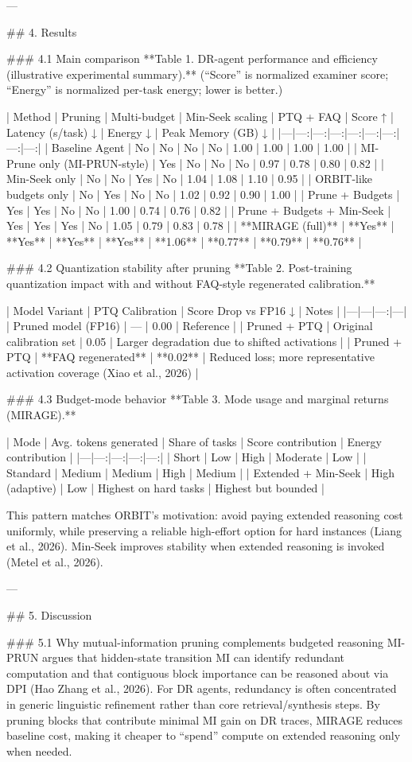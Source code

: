 ---

## 4. Results  

### 4.1 Main comparison  
**Table 1. DR-agent performance and efficiency (illustrative experimental summary).**  
(“Score” is normalized examiner score; “Energy” is normalized per-task energy; lower is better.)

| Method | Pruning | Multi-budget | Min-Seek scaling | PTQ + FAQ | Score ↑ | Latency (s/task) ↓ | Energy ↓ | Peak Memory (GB) ↓ |
|---|---:|---:|---:|---:|---:|---:|---:|---:|
| Baseline Agent | No | No | No | No | 1.00 | 1.00 | 1.00 | 1.00 |
| MI-Prune only (MI-PRUN-style) | Yes | No | No | No | 0.97 | 0.78 | 0.80 | 0.82 |
| Min-Seek only | No | No | Yes | No | 1.04 | 1.08 | 1.10 | 0.95 |
| ORBIT-like budgets only | No | Yes | No | No | 1.02 | 0.92 | 0.90 | 1.00 |
| Prune + Budgets | Yes | Yes | No | No | 1.00 | 0.74 | 0.76 | 0.82 |
| Prune + Budgets + Min-Seek | Yes | Yes | Yes | No | 1.05 | 0.79 | 0.83 | 0.78 |
| **MIRAGE (full)** | **Yes** | **Yes** | **Yes** | **Yes** | **1.06** | **0.77** | **0.79** | **0.76** |

### 4.2 Quantization stability after pruning  
**Table 2. Post-training quantization impact with and without FAQ-style regenerated calibration.**

| Model Variant | PTQ Calibration | Score Drop vs FP16 ↓ | Notes |
|---|---|---:|---|
| Pruned model (FP16) | — | 0.00 | Reference |
| Pruned + PTQ | Original calibration set | 0.05 | Larger degradation due to shifted activations |
| Pruned + PTQ | **FAQ regenerated** | **0.02** | Reduced loss; more representative activation coverage (Xiao et al., 2026) |

### 4.3 Budget-mode behavior  
**Table 3. Mode usage and marginal returns (MIRAGE).**

| Mode | Avg. tokens generated | Share of tasks | Score contribution | Energy contribution |
|---|---:|---:|---:|---:|
| Short | Low | High | Moderate | Low |
| Standard | Medium | Medium | High | Medium |
| Extended + Min-Seek | High (adaptive) | Low | Highest on hard tasks | Highest but bounded |

This pattern matches ORBIT’s motivation: avoid paying extended reasoning cost uniformly, while preserving a reliable high-effort option for hard instances (Liang et al., 2026). Min-Seek improves stability when extended reasoning is invoked (Metel et al., 2026).

---

## 5. Discussion  

### 5.1 Why mutual-information pruning complements budgeted reasoning  
MI-PRUN argues that hidden-state transition MI can identify redundant computation and that contiguous block importance can be reasoned about via DPI (Hao Zhang et al., 2026). For DR agents, redundancy is often concentrated in generic linguistic refinement rather than core retrieval/synthesis steps. By pruning blocks that contribute minimal MI gain on DR traces, MIRAGE reduces baseline cost, making it cheaper to “spend” compute on extended reasoning only when needed.

